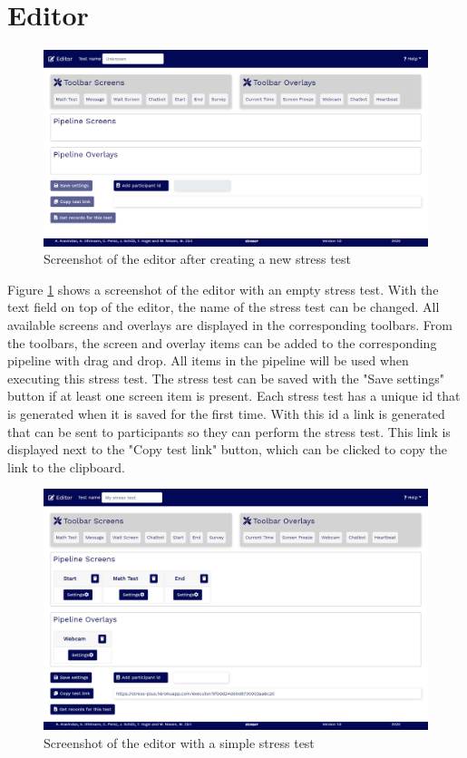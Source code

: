 \section{Editor}
\label{sec:editor}

\begin{figure}[htb]
    \centering
    \includegraphics[width=\textwidth]{figures/screenshot-editor.png}
    \caption{Screenshot of the editor after creating a new stress test}
    \label{fig:screenshot-editor}
\end{figure}

Figure \ref{fig:screenshot-editor} shows a screenshot of the editor with an empty stress test.
With the text field on top of the editor, the name of the stress test can be changed.
All available screens and overlays are displayed in the corresponding toolbars.
From the toolbars, the screen and overlay items can be added to the corresponding pipeline with drag and drop.
All items in the pipeline will be used when executing this stress test.
The stress test can be saved with the "Save settings" button if at least one screen item is present.
Each stress test has a unique id that is generated when it is saved for the first time.
With this id a link is generated that can be sent to participants so they can perform the stress test.
This link is displayed next to the "Copy test link" button, which can be clicked to copy the link to the clipboard.

\begin{figure}[htb]
    \centering
    \includegraphics[width=\textwidth]{figures/screenshot-editor-with-items.png}
    \caption{Screenshot of the editor with a simple stress test}
    \label{fig:screenshot-editor-with-items}
\end{figure}

